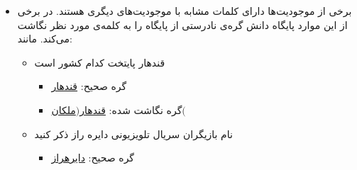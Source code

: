 \begin{itemize}
	\item
	 برخی از موجودیت‌ها دارای کلمات مشابه با موجودیت‌های دیگری هستند. در برخی از این موارد پایگاه دانش گره‌ی نادرستی از پایگاه را به کلمه‌ی مورد نظر نگاشت می‌کند. مانند:
		\begin{itemize} 
			\item قندهار پایتخت کدام کشور است
				\begin{itemize} 
					\small
					\item گره صحیح: 
					\href{http://fkg.iust.ac.ir/resource/\%D9\%82\%D9\%86\%D8\%AF\%D9\%87\%D8\%A7\%D8\%B1}
{قندهار}
					\item گره نگاشت شده:
					\href{http://fkg.iust.ac.ir/resource/\%D9\%82\%D9\%86\%D8\%AF\%D9\%87\%D8\%A7\%D8\%B1\_\%28\%D9\%85\%D9\%84\%DA\%A9\%D8\%A7\%D9\%86\%29}
					{قندهار\lr{\_}$)$ملکان$($}
			\end{itemize}
			\item نام بازیگران سریال تلویزیونی دایره راز ذکر کنید
				\begin{itemize} 
					\small
					\item گره صحیح: 
					\href{http://fkg.iust.ac.ir/resource/\%D8\%AF\%D8\%A7\%DB\%8C\%D8\%B1\%D9\%87\_\%D8\%B1\%D8\%A7\%D8\%B2}
					{دایره\lr{\_}راز}
					

\end{itemize}
\end{itemize}
\end{itemize}
